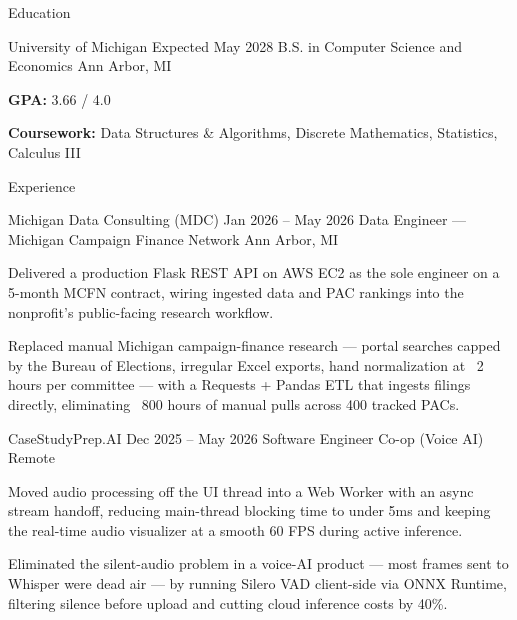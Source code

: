 \documentclass[
	11pt
]{../../../template}
\begin{document}
	\begin{rSection}{E}{ducation}
		\begin{rSectionEntry}
			{University of Michigan}
			{Expected May 2028}
			{B.S. in Computer Science and Economics}
			{}
			{Ann Arbor, MI}

			\item \textbf{GPA:} 3.66 / 4.0
			\item \textbf{Coursework:} Data Structures \& Algorithms, Discrete Mathematics, Statistics, Calculus III
		\end{rSectionEntry}
	\end{rSection}

	\begin{rSection}{E}{xperience}
		\begin{rSectionEntry}
			{Michigan Data Consulting (MDC)}
			{Jan 2026 -- May 2026}
			{Data Engineer --- Michigan Campaign Finance Network}
			{}
			{Ann Arbor, MI}

			\item Delivered a production Flask REST API on AWS EC2 as the sole engineer on a 5-month MCFN contract, wiring ingested data and PAC rankings into the nonprofit's public-facing research workflow.
			\item Replaced manual Michigan campaign-finance research --- portal searches capped by the Bureau of Elections, irregular Excel exports, hand normalization at ~2 hours per committee --- with a Requests + Pandas ETL that ingests filings directly, eliminating ~800 hours of manual pulls across 400 tracked PACs.
		\end{rSectionEntry}

		\begin{rSectionEntry}
			{CaseStudyPrep.AI}
			{Dec 2025 -- May 2026}
			{Software Engineer Co-op (Voice AI)}
			{}
			{Remote}

			\item Moved audio processing off the UI thread into a Web Worker with an async stream handoff, reducing main-thread blocking time to under 5ms and keeping the real-time audio visualizer at a smooth 60 FPS during active inference.
			\item Eliminated the silent-audio problem in a voice-AI product --- most frames sent to Whisper were dead air --- by running Silero VAD client-side via ONNX Runtime, filtering silence before upload and cutting cloud inference costs by 40\%.
		\end{rSectionEntry}
	\end{rSection}
\end{document}
